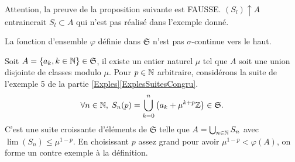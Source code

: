 Attention, la preuve de la proposition suivante est FAUSSE. $(S_l)\uparrow A$ entrainerait $S_l \subset A$ qui n'est pas réalisé dans l'exemple donné.
\begin{propn}
 La fonction d'ensemble $\varphi$ définie dans $\mathfrak{S}$ n'est pas $\sigma$-continue vers le haut.
\end{propn}
\begin{demo}
 Soit $A = \left\lbrace a_k, k\in \mathbb{N}\right\rbrace \in \mathfrak{S}$, il existe un entier naturel $\mu$ tel que $A$ soit une union disjointe de classes modulo $\mu$. Pour $p\in \mathbb{N}$ arbitraire, considérons la suite de l'exemple 5 de la partie \ref{Exples}\ref{ExplesSuitesCongru}.
\begin{displaymath}
 \forall n \in \mathbb{N}, \; S_n(p) = \bigcup_{k =0}^n \left(a_k + \mu^{k+p} \mathbb{Z}\right) \in \mathfrak{S}.
\end{displaymath}
C'est une suite croissante d'éléments de $\mathfrak{S}$ telle que $A = \bigcup_{n\in \mathbb{N}}S_n$ avec $\lim (S_n)\leq \mu^{1-p}$. En choisissant $p$ assez grand pour avoir $\mu^{1-p} < \varphi(A)$, on forme un contre exemple à la définition.
\end{demo}

